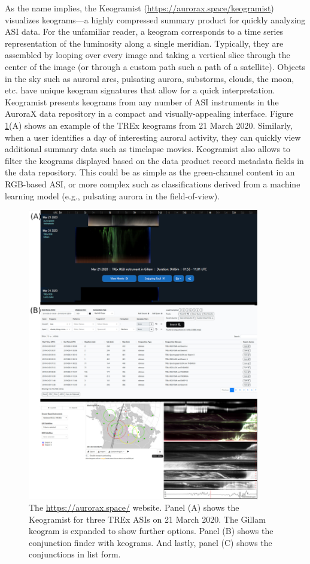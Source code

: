 \documentclass[utf8]{FrontiersinHarvard} %
\begin{document}
As the name implies, the Keogramist (\url{https://aurorax.space/keogramist}) visualizes keograms---a highly compressed summary product for quickly analyzing ASI data. For the unfamiliar reader, a keogram corresponds to a time series representation of the luminosity along a single meridian. Typically, they are assembled by looping over every image and taking a vertical slice through the center of the image (or through a custom path such a path of a satellite). Objects in the sky such as auroral arcs, pulsating aurora, substorms, clouds, the moon, etc. have unique keogram signatures that allow for a quick interpretation. Keogramist presents keograms from any number of ASI instruments in the AuroraX data repository in a compact and visually-appealing interface. Figure \ref{fig1}(A) shows an example of the TREx keograms from 21 March 2020. Similarly, when a user identifies a day of interesting auroral activity, they can quickly view additional summary data such as timelapse movies. Keogramist also allows to filter the keograms displayed based on the data product record metadata fields in the data repository. This could be as simple as the green-channel content in an RGB-based ASI, or more complex such as classifications derived from a machine learning model (e.g., pulsating aurora in the field-of-view).

\begin{figure}
    \centering
    \includegraphics[width=0.9\textwidth]{figures/fig1.jpg}
    \caption{The \url{https://aurorax.space/} website. Panel (A) shows the Keogramist for three TREx ASIs on 21 March 2020. The Gillam keogram is expanded to show further options. Panel (B) shows the conjunction finder with keograms. And lastly, panel (C) shows the conjunctions in list form.}
    \label{fig1}
\end{figure}
\end{document}
